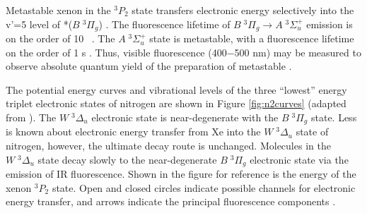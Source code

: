 Metastable xenon in the $^3P_2$ state transfers electronic energy
selectively into the v'=5 level of *($B \; ^3\Pi_g$)
\cite{krumpelmann87, krumpelmann88, ottinger95b, aardema94}.  The
fluorescence lifetime of $B \; ^3\Pi_g \rightarrow A \; ^3\Sigma_u^+$
emission is on the order of 10 \microsec\ \cite{lofthus77}.  The $A \;
^3\Sigma_u^+$ state is metastable, with a fluorescence lifetime on the
order of 1 s \cite{lofthus77}.  Thus, visible fluorescence (400$-$500
nm) may be measured to observe absolute quantum yield of the
preparation of metastable .

The potential energy curves and vibrational levels of the three
``lowest'' energy triplet electronic states of nitrogen are shown in
Figure \ref{fig:n2curves} (adapted from \cite{krumpelmann87}).  The $W
\; ^3\Delta_u$ electronic state is near-degenerate with the $B \;
^3\Pi_g$ state.  Less is known about electronic energy transfer from
Xe into the $W \; ^3\Delta_u$ state of nitrogen, however, the ultimate
decay route is unchanged.  Molecules in the $W \; ^3\Delta_u$ state
decay slowly to the near-degenerate $B \; ^3\Pi_g$ electronic state
via the emission of IR fluorescence.  Shown in the figure for
reference is the energy of the xenon $^3P_2$ state.  Open and closed
circles indicate possible channels for electronic energy transfer, and
arrows indicate the principal fluorescence components
\cite{krumpelmann87}.

